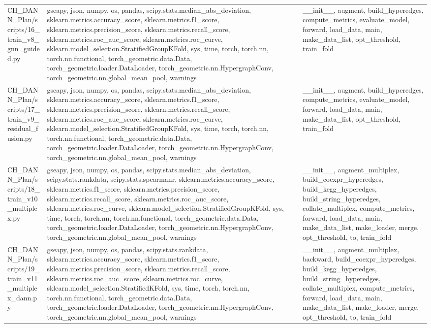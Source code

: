 \documentclass[11pt]{article}
\begin{document}
\begin{longtable}{p{}p{}p{}}
CH\_DANN\_Plan/scripts/16\_train\_v8\_gnn\_guided.py & gseapy, json, numpy, os, pandas, scipy.stats.median\_abs\_deviation, sklearn.metrics.accuracy\_score, sklearn.metrics.f1\_score, sklearn.metrics.precision\_score, sklearn.metrics.recall\_score, sklearn.metrics.roc\_auc\_score, sklearn.metrics.roc\_curve, sklearn.model\_selection.StratifiedGroupKFold, sys, time, torch, torch.nn, torch.nn.functional, torch\_geometric.data.Data, torch\_geometric.loader.DataLoader, torch\_geometric.nn.HypergraphConv, torch\_geometric.nn.global\_mean\_pool, warnings & \_\_init\_\_, augment, build\_hyperedges, compute\_metrics, evaluate\_model, forward, load\_data, main, make\_data\_list, opt\_threshold, train\_fold \\
CH\_DANN\_Plan/scripts/17\_train\_v9\_residual\_fusion.py & gseapy, json, numpy, os, pandas, scipy.stats.median\_abs\_deviation, sklearn.metrics.accuracy\_score, sklearn.metrics.f1\_score, sklearn.metrics.precision\_score, sklearn.metrics.recall\_score, sklearn.metrics.roc\_auc\_score, sklearn.metrics.roc\_curve, sklearn.model\_selection.StratifiedGroupKFold, sys, time, torch, torch.nn, torch.nn.functional, torch\_geometric.data.Data, torch\_geometric.loader.DataLoader, torch\_geometric.nn.HypergraphConv, torch\_geometric.nn.global\_mean\_pool, warnings & \_\_init\_\_, augment, build\_hyperedges, compute\_metrics, evaluate\_model, forward, load\_data, main, make\_data\_list, opt\_threshold, train\_fold \\
CH\_DANN\_Plan/scripts/18\_train\_v10\_multiplex.py & gseapy, json, numpy, os, pandas, scipy.stats.median\_abs\_deviation, scipy.stats.rankdata, scipy.stats.spearmanr, sklearn.metrics.accuracy\_score, sklearn.metrics.f1\_score, sklearn.metrics.precision\_score, sklearn.metrics.recall\_score, sklearn.metrics.roc\_auc\_score, sklearn.metrics.roc\_curve, sklearn.model\_selection.StratifiedGroupKFold, sys, time, torch, torch.nn, torch.nn.functional, torch\_geometric.data.Data, torch\_geometric.loader.DataLoader, torch\_geometric.nn.HypergraphConv, torch\_geometric.nn.global\_mean\_pool, warnings & \_\_init\_\_, augment\_multiplex, build\_coexpr\_hyperedges, build\_kegg\_hyperedges, build\_string\_hyperedges, collate\_multiplex, compute\_metrics, forward, load\_data, main, make\_data\_list, make\_loader, merge, opt\_threshold, to, train\_fold \\
CH\_DANN\_Plan/scripts/19\_train\_v11\_multiplex\_dann.py & gseapy, json, numpy, os, pandas, scipy.stats.rankdata, sklearn.metrics.accuracy\_score, sklearn.metrics.f1\_score, sklearn.metrics.precision\_score, sklearn.metrics.recall\_score, sklearn.metrics.roc\_auc\_score, sklearn.metrics.roc\_curve, sklearn.model\_selection.StratifiedKFold, sys, time, torch, torch.nn, torch.nn.functional, torch\_geometric.data.Data, torch\_geometric.loader.DataLoader, torch\_geometric.nn.HypergraphConv, torch\_geometric.nn.global\_mean\_pool, warnings & \_\_init\_\_, augment\_multiplex, backward, build\_coexpr\_hyperedges, build\_kegg\_hyperedges, build\_string\_hyperedges, collate\_multiplex, compute\_metrics, forward, load\_data, main, make\_data\_list, make\_loader, merge, opt\_threshold, to, train\_fold \\

\end{longtable}
\end{document}
